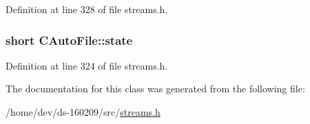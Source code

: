 Definition at line 328 of file streams.\+h.

\hypertarget{class_c_auto_file_aa345c8c05e4b305762c35fffd4fe2f26}{}
\subsubsection[{state}]{\setlength{\rightskip}{0pt plus 5cm}short C\+Auto\+File\+::state\hspace{0.3cm}{\ttfamily [protected]}}\label{class_c_auto_file_aa345c8c05e4b305762c35fffd4fe2f26}


Definition at line 324 of file streams.\+h.



The documentation for this class was generated from the following file\+:\begin{DoxyCompactItemize}
\item 
/home/dev/ds-\/160209/src/\hyperlink{streams_8h}{streams.\+h}\end{DoxyCompactItemize}
